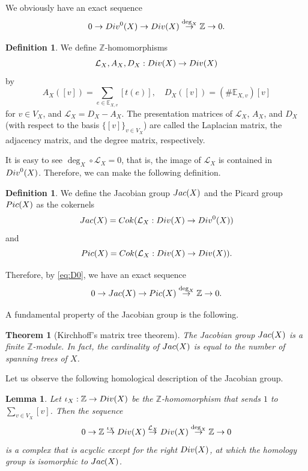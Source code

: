 \documentclass[11pt]{article}
\newtheorem{lemm}[theo]{Lemma}
\newtheorem{thm}[theo]{Theorem}
\theoremstyle{definition}
\newtheorem{defi}[theo]{Definition}
\numberwithin{equation}{section}
\newcommand{\Z}{\mathbb{Z}}
\newcommand{\bE}{\mathbb{E}}
\newcommand{\cL}{\mathcal{L}}
\newcommand{\Coker}{{\rm Cok}}
\newcommand{\Div}{{\rm Div}}
\newcommand{\Pic}{{\rm Pic}}
\newcommand{\Jac}{{\rm Jac}}
\begin{document}
We obviously have an exact sequence
\begin{equation}\label{eq:D0}
0 \to \Div^0(X) \to \Div(X) \overset{\deg_X}{\to} \Z \to 0.
\end{equation}

\begin{defi}\label{defn:LAD}
We define $\Z$-homomorphisms
\[
\cL_X, A_X, D_X: \Div(X) \to \Div(X)
\]
by
\[
A_X([v]) = \sum_{e \in \bE_{X, v}} [t(e)],
\quad
D_X([v]) = (\# \bE_{X, v}) [v]
\]
for $v \in V_X$, and $\cL_X = D_X - A_X$.
The presentation matrices of $\cL_X$, $A_X$, and $D_X$ (with respect to the basis $\{ [v] \}_{v \in V_X}$) are called the Laplacian matrix, the adjacency matrix, and the degree matrix, respectively.
\end{defi}

It is easy to see $\deg_X \circ \cL_X = 0$, that is, the image of $\cL_X$ is contained in $\Div^0(X)$.
Therefore, we can make the following definition.

\begin{defi}\label{defn:JP}
We define the Jacobian group $\Jac(X)$ and the Picard group $\Pic(X)$ as the cokernels
\[
\Jac(X) = \Coker(\cL_X: \Div(X) \to \Div^0(X))
\]
and
\[
\Pic(X) = \Coker(\cL_X: \Div(X) \to \Div(X)).
\]
\end{defi}

Therefore, by \eqref{eq:D0}, we have an exact sequence
\begin{equation}\label{eq:JP_ex}
0 \to \Jac(X) \to \Pic(X) \overset{\deg_X}{\to} \Z\to 0.
\end{equation}

A fundamental property of the Jacobian group is the following.

\begin{thm}[Kirchhoff's matrix tree theorem]\label{thm:Kirch}
The Jacobian group $\Jac(X)$ is a finite $\Z$-module.
In fact, the cardinality of $\Jac(X)$ is equal to the number of spanning trees of $X$.
\end{thm}

Let us observe the following homological description of the Jacobian group.

\begin{lemm}\label{lem:cpx_J}
Let $\iota_X: \Z \to \Div(X)$ be the $\Z$-homomorphism that sends $1$ to $\sum_{v \in V_X} [v]$.
Then the sequence
\begin{equation}\label{eq:cpx_J}
0 \to \Z \overset{\iota_X}{\to} \Div(X) \overset{\cL_X}{\to} \Div(X) \overset{\deg_X}{\to} \Z \to 0
\end{equation}
is a complex that is acyclic except for the right $\Div(X)$, at which the homology group is isomorphic to $\Jac(X)$.
\end{lemm}
\end{document}
